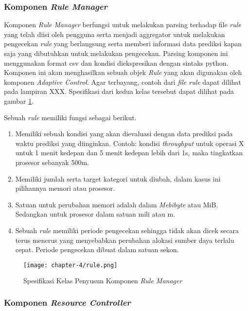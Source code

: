 \subsubsection{Komponen \textit{Rule Manager}}
Komponen \textit{Rule Manager} berfungsi untuk melakukan parsing terhadap file \textit{rule} yang telah diisi oleh pengguna serta menjadi aggregator untuk melakukan pengecekan \textit{rule} yang berlangsung serta memberi informasi data prediksi kapan saja yang dibutuhkan untuk melakukan pengecekan. Parsing komponen ini menggunakan format csv dan kondisi diekspresikan dengan sintaks python. Komponen ini akan menghasilkan sebuah objek \textit{Rule} yang akan digunakan oleh komponen \textit{Adaptive Control}. Agar terbayang, contoh dari \textit{file rule} dapat dilihat pada lampiran XXX. Spesifikasi dari kedua kelas tersebut dapat dilihat pada gambar \ref{fig:rule-spek}.


Sebuah \textit{rule} memiliki fungsi sebagai berikut.
\begin{enumerate}
    \item Memiliki sebuah kondisi yang akan dievaluasi dengan data prediksi pada waktu prediksi yang diinginkan. Contoh: kondisi \textit{throughput} untuk operasi X untuk 1 menit kedepan dan 5 menit kedepan lebih dari 1s, maka tingkatkan prosesor sebanyak 500m.
    \item Memiliki jumlah serta target kategori untuk diubah, dalam kasus ini pilihannya memori atau prosesor.
    \item Satuan untuk perubahan memori adalah dalam \textit{Mebibyte} atau MiB. Sedangkan untuk prosesor dalam satuan mili atau m.
    \item Sebuah \textit{rule} memiliki periode pengecekan sehingga tidak akan dicek secara terus menerus yang menyebabkan perubahan alokasi sumber daya terlalu cepat. Periode pengecekan dibuat dalam satuan sekon.
\end{enumerate}

\begin{figure}[h]
    \centering
    \texttt{[image: chapter-4/rule.png]}
    \caption{Spesifikasi Kelas Penyusun Komponen \textit{Rule Manager}}
    \label{fig:rule-spek}
\end{figure}

\subsubsection{Komponen \textit{Resource Controller}}

